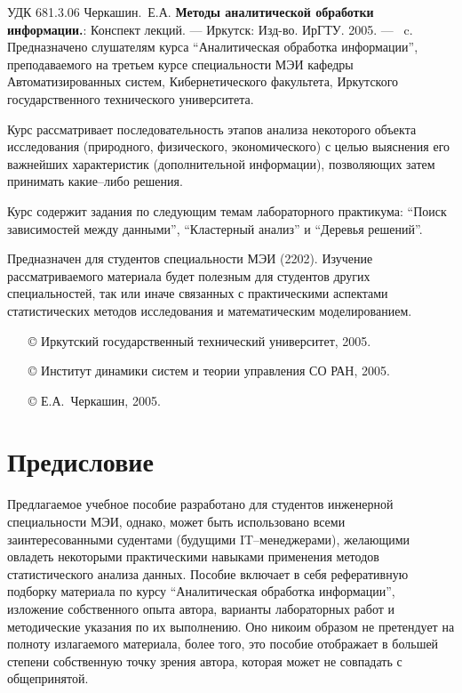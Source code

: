 \documentclass[12pt, openany, twoside]{book} %
\newenvironment{mygroup}{}{}
\begin{document}
\newpage
\begin{mygroup}
\thispagestyle{empty}
\noindent УДК 681.3.06
\vfill\footnotesize
{Черкашин.~Е.А.} {\bf Методы аналитической обработки информации.}: Конспект лекций. ---
Иркутск: Изд-во. ИрГТУ. 2005. --- \pageref{pg:lastpage}~c.
\vfill
Предназначено слушателям курса
``Аналитическая обработка информации'', преподаваемого на третьем курсе
специальности МЭИ кафедры Автоматизированных систем, Кибернетического факультета,
Иркутского государственного технического университета.

Курс рассматривает последовательность этапов
анализа некоторого объекта исследования (природного, физического,
экономического) с целью выяснения его важнейших  характеристик (дополнительной
информации), позволяющих затем
принимать какие--либо решения. 

Курс содержит задания по следующим темам лабораторного практикума: ``Поиск зависимостей между данными'',
``Кластерный анализ'' и ``Деревья решений''.

    Предназначен для студентов специальности
МЭИ (2202).
Изучение рассматриваемого материала будет полезным для студентов других специальностей, так или иначе связанных с практическими аспектами статистических методов исследования и математическим моделированием.

\vfill\vfill

\vfill
\hbox{}\hfill
\begin{minipage}{0.6\linewidth}
\begin{itemize}
\setlength{\itemsep}{0pt}
\setlength{\parsep}{0pt}
\item[\copyright{}] Иркутский государственный технический университет, 2005.\item[\copyright{}] Институт динамики систем и теории управления СО РАН, 2005.
\item[\copyright{}] Е.А.~Черкашин, 2005.
\end{itemize}
\end{minipage}
\end{mygroup}
\tableofcontents
\clearpage

\newpage
\section*{Предисловие}
\thispagestyle{empty}

Предлагаемое учебное пособие разработано для студентов
 инженерной специальности МЭИ, однако, может быть использовано всеми
заинтересованными судентами (будущими IT--менеджерами), 
желающими овладеть некоторыми практическими навыками применения методов 
статистического анализа данных.
Пособие включает в себя рефе\-ра\-тив\-ную
подборку материала по курсу ``Аналитическая обработка информации'',
изложение собственного опыта автора, варианты лабораторных работ и методические
указания по их выполнению. Оно никоим образом не претендует на
полноту излагаемого материала, более того, это пособие отображает в большей
степени собственную точку зрения автора, которая может не совпадать с общепринятой.
\end{document}
